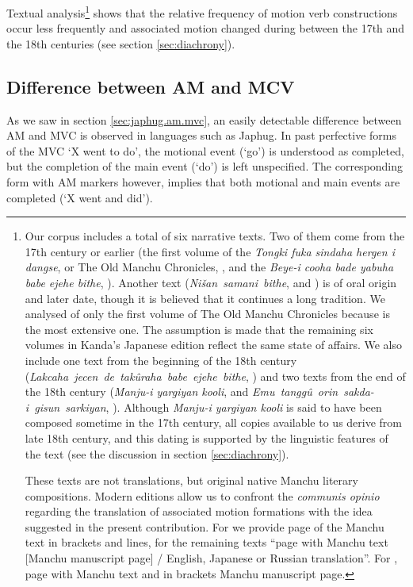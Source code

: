\documentclass{article}
\newcommand{\ipa}[1]{\textit{{\phon\mbox{#1}}}} %
\begin{document}
Textual analysis\footnote{Our corpus includes a total of six narrative texts. Two of them come from the 17th century or earlier (the first volume of the \textit{Tongki fuka sindaha hergen i dangse}, or The Old Manchu Chronicles, \citet{kanda55tongki}, and the \textit{Beye-i cooha bade yabuha babe ejehe bithe}, \citealt{cosmo06dzengseo}). Another text  (\ipa{Nišan samani bithe}, \citealt{nowak77nisan} and \citealt{jaxontov93nisan}) is of oral origin and later date, though it is believed that it continues a long tradition. We analysed of only the first volume of The Old Manchu Chronicles because is the most extensive one. The assumption is made that the remaining six volumes in Kanda’s Japanese edition reflect the same state of affairs. We also include one text from the beginning of the 18th century (\ipa{Lakcaha jecen de takûraha babe ejehe bithe}, \citealt{shunjuu64tulishen}) and two texts from the end of the 18th century  (\textit{Manju-i yargiyan kooli}, \citealt{shunjuu92yargiyan} and \ipa{Emu tanggû orin sakda-i gisun sarkiyan}, \citealt{stary83sakda}). Although \textit{Manju-i yargiyan kooli }is said to have been composed sometime in the 17th century, all copies available to us derive from late 18th century, and this dating is supported by the linguistic features of the text (see the discussion in section \ref{sec:diachrony}).

These texts are not translations, but original native Manchu literary compositions. Modern editions allow us to confront the \textit{communis opinio} regarding the translation of associated motion formations with the idea suggested in the present contribution. For \citet{shunjuu92yargiyan} we provide page of the Manchu text in brackets and lines, for the remaining texts “page with Manchu text [Manchu manuscript page] / English, Japanese or Russian translation”. For \citet{stary83sakda}, page with Manchu text and in brackets Manchu manuscript page.} shows that the relative frequency of motion verb constructions occur less frequently and associated motion changed during between the 17th and the 18th centuries (see section \ref{sec:diachrony}).




\subsection{Difference between AM and MCV} \label{sec:mvc.manchu}
As we saw in section \ref{sec:japhug.am.mvc}, an easily detectable difference between AM and MVC is observed in languages such as Japhug. In past perfective forms of the MVC ‘X went to do’, the motional event (‘go’) is understood as completed, but the completion of the main event (‘do’) is left unspecified. The corresponding form with AM markers however, implies that both motional and main events are completed (‘X went and did’). 
\end{document}

